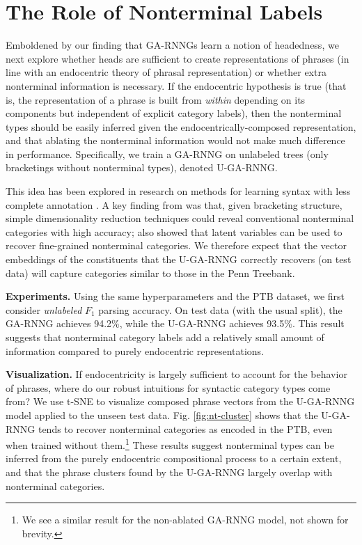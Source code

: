 \documentclass[11pt]{article}
\begin{document}
\section{The Role of Nonterminal Labels}\label{sec:bracketing}


Emboldened by our finding that GA-RNNGs learn a notion of headedness, we next explore whether heads are sufficient to create representations of phrases (in line with an endocentric theory of phrasal representation) or whether extra nonterminal information is necessary.  If the endocentric hypothesis is true (that is, the representation of a phrase is built from \emph{within} depending on its components but independent of explicit category labels), then the nonterminal types should be easily inferred given the endocentrically-composed representation, and that ablating the nonterminal information would not make much difference in performance. Specifically, we train a GA-RNNG on unlabeled trees (only bracketings without nonterminal types), denoted U-GA-RNNG.  

This idea has been explored in research on methods for learning syntax with less complete annotation \cite{pereira-92}.   A key finding from  was that, given bracketing structure, simple dimensionality reduction techniques could reveal conventional nonterminal categories with high accuracy;  also showed that latent variables can be used to recover fine-grained nonterminal categories.  We therefore expect that the vector embeddings of the constituents that the U-GA-RNNG correctly recovers (on test data) will capture categories similar to those in the Penn Treebank. 

\textbf{Experiments.} Using the same hyperparameters and the PTB dataset, we first consider \emph{unlabeled} $F_1$ parsing accuracy.  On test data (with the usual split), the GA-RNNG achieves 94.2\%, while the U-GA-RNNG achieves 93.5\%. This result suggests that nonterminal category labels add a relatively small amount of information compared to purely endocentric representations.







\textbf{Visualization.} If endocentricity is largely sufficient to account for the behavior of phrases, where do our robust intuitions for syntactic category types come from? We use t-SNE \cite{maaten_08} to visualize composed phrase vectors from the U-GA-RNNG model applied to the unseen test data.
Fig. \ref{fig:nt-cluster} shows that the U-GA-RNNG tends to recover nonterminal categories as encoded in the PTB, even when trained without them.\footnote{We see a similar result for the non-ablated GA-RNNG model, not shown for brevity.} These results suggest nonterminal types can be inferred from the purely endocentric compositional process to a certain extent, and that the phrase clusters found by the U-GA-RNNG largely overlap with nonterminal categories.  
\end{document}

